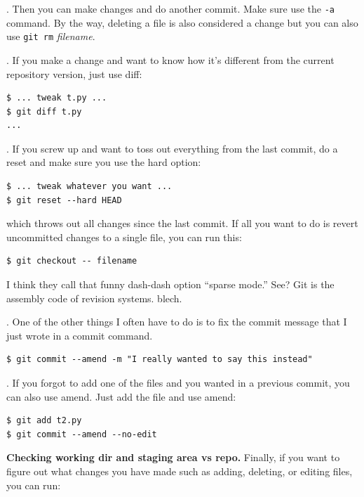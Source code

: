 \begin{fullwidth}
. Then you can make changes and do another commit. Make sure use the {\tt -a} command. By the way, deleting a file is also considered a change but you can also use {\tt git rm} {\em filename}.

. If you make a change and want to know how it's different from the current repository version, just use diff:

\begin{lstlisting}[style=BashInputStyle]
$ ... tweak t.py ...
$ git diff t.py
...
\end{lstlisting}

. If you screw up and want to toss out everything from the last commit, do a reset and make sure you use the hard option:

\begin{lstlisting}[style=BashInputStyle]
$ ... tweak whatever you want ...
$ git reset --hard HEAD
\end{lstlisting}

\noindent which throws out all changes since the last commit. If all you want to do is revert uncommitted changes to a single file, you can run this:

\begin{lstlisting}[style=BashInputStyle]
$ git checkout -- filename
\end{lstlisting}

I think they call that funny dash-dash option ``sparse mode.'' See? Git is the assembly code of revision systems. blech.

. One of the other things I often have to do is to fix the commit message that I just wrote in a commit command.

\begin{lstlisting}[style=BashInputStyle]
$ git commit --amend -m "I really wanted to say this instead"
\end{lstlisting}

. If you forgot to add one of the files and you wanted in a previous commit, you can also use amend. Just add the file and use amend:

\begin{lstlisting}[style=BashInputStyle]
$ git add t2.py
$ git commit --amend --no-edit
\end{lstlisting}

{\bf Checking working dir and staging area vs repo.} Finally, if you want to figure out what changes you have made such as adding, deleting, or editing files, you can run:


\end{fullwidth}
